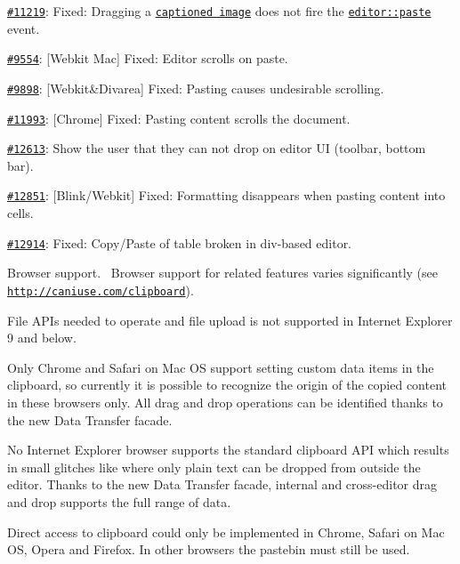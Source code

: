 \begin{DoxyItemize}
\begin{DoxyItemize}
\begin{DoxyItemize}
\item \href{http://dev.ckeditor.com/ticket/11219}{\tt \#11219}\+: Fixed\+: Dragging a \href{http://ckeditor.com/addon/image2}{\tt captioned image} does not fire the \href{http://docs.ckeditor.com/#!/api/CKEDITOR.editor-event-paste}{\tt {\ttfamily editor\+::paste}} event.
\item \href{http://dev.ckeditor.com/ticket/9554}{\tt \#9554}\+: \mbox{[}Webkit Mac\mbox{]} Fixed\+: Editor scrolls on paste.
\item \href{http://dev.ckeditor.com/ticket/9898}{\tt \#9898}\+: \mbox{[}Webkit\&Divarea\mbox{]} Fixed\+: Pasting causes undesirable scrolling.
\item \href{http://dev.ckeditor.com/ticket/11993}{\tt \#11993}\+: \mbox{[}Chrome\mbox{]} Fixed\+: Pasting content scrolls the document.
\item \href{http://dev.ckeditor.com/ticket/12613}{\tt \#12613}\+: Show the user that they can not drop on editor UI (toolbar, bottom bar).
\item \href{http://dev.ckeditor.com/ticket/12851}{\tt \#12851}\+: \mbox{[}Blink/\+Webkit\mbox{]} Fixed\+: Formatting disappears when pasting content into cells.
\item \href{http://dev.ckeditor.com/ticket/12914}{\tt \#12914}\+: Fixed\+: Copy/\+Paste of table broken in {\ttfamily div}-\/based editor.
\end{DoxyItemize}
\item Browser support.~\newline
Browser support for related features varies significantly (see \href{http://caniuse.com/clipboard}{\tt http\+://caniuse.\+com/clipboard}).
\begin{DoxyItemize}
\item File A\+P\+Is needed to operate and file upload is not supported in Internet Explorer 9 and below.
\item Only Chrome and Safari on Mac OS support setting custom data items in the clipboard, so currently it is possible to recognize the origin of the copied content in these browsers only. All drag and drop operations can be identified thanks to the new Data Transfer facade.
\item No Internet Explorer browser supports the standard clipboard A\+PI which results in small glitches like where only plain text can be dropped from outside the editor. Thanks to the new Data Transfer facade, internal and cross-\/editor drag and drop supports the full range of data.
\item Direct access to clipboard could only be implemented in Chrome, Safari on Mac OS, Opera and Firefox. In other browsers the pastebin must still be used.

\end{DoxyItemize}
\end{DoxyItemize}
\end{DoxyItemize}
